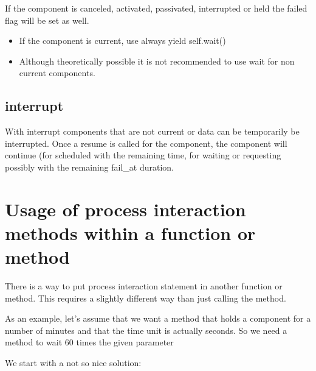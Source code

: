 \documentclass[letterpaper,10pt,english]{sphinxmanual}
\begin{document}
If the component is canceled, activated, passivated, interrupted or held the failed flag will be set as well.
\begin{itemize}
\item {} 
If the component is current, use always yield self.wait()

\item {} 
Although theoretically possible it is not recommended to use wait for non current components.

\end{itemize}


\subsection{interrupt}
\label{\detokenize{Component:interrupt}}
With interrupt components that are not current or data can be temporarily be interrupted. Once a resume is called for
the component, the component will continue (for scheduled with the remaining time, for waiting or requesting possibly with
the remaining fail\_at duration.


\section{Usage of process interaction methods within a function or method}
\label{\detokenize{Component:usage-of-process-interaction-methods-within-a-function-or-method}}
There is a way to put process interaction statement in another function or method.
This requires a slightly different way than just calling the method.

As an example, let’s assume that we want a method that holds a component for a number of minutes and that the time unit is actually seconds.
So we need a method to wait 60 times the given parameter

We start with a not so nice solution:

%
\begin{sphinxVerbatim}[commandchars=\\\{\}]
 
     
           
           
\end{sphinxVerbatim}
\end{document}
